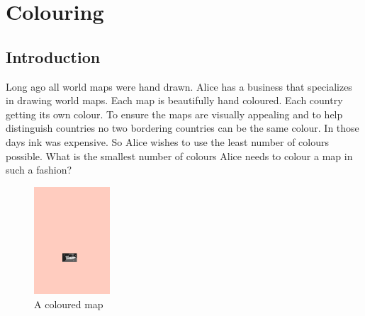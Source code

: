 \chapter{Colouring}\label{chpt:colouring}

\section{Introduction}

Long ago all world maps were hand drawn. Alice has a business that specializes in drawing world maps. Each map is beautifully hand coloured. Each country getting its own colour. To ensure the maps are visually appealing and to help distinguish countries no two bordering countries can be the same colour. In those days ink was expensive. So Alice wishes to use the least number of colours possible. What is the smallest number of colours Alice needs to colour a map in such a fashion? 

\begin{figure}[h]
    \centering
    \includegraphics[height=40mm]{images/161-fig37}
    \caption{A coloured map}
\end{figure}

